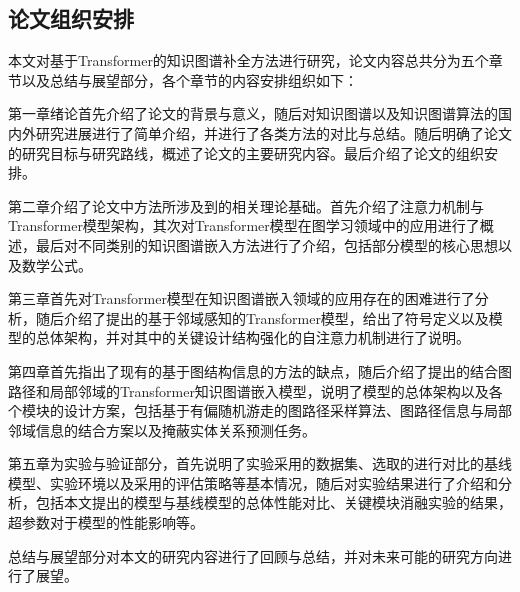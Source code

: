 \subsection{论文组织安排}
本文对基于Transformer的知识图谱补全方法进行研究，论文内容总共分为五个章节以及总结与展望部分，各个章节的内容安排组织如下：

第一章绪论首先介绍了论文的背景与意义，随后对知识图谱以及知识图谱算法的国内外研究进展进行了简单介绍，并进行了各类方法的对比与总结。随后明确了论文的研究目标与研究路线，概述了论文的主要研究内容。最后介绍了论文的组织安排。

第二章介绍了论文中方法所涉及到的相关理论基础。首先介绍了注意力机制与Transformer模型架构，其次对Transformer模型在图学习领域中的应用进行了概述，最后对不同类别的知识图谱嵌入方法进行了介绍，包括部分模型的核心思想以及数学公式。

第三章首先对Transformer模型在知识图谱嵌入领域的应用存在的困难进行了分析，随后介绍了提出的基于邻域感知的Transformer模型，给出了符号定义以及模型的总体架构，并对其中的关键设计结构强化的自注意力机制进行了说明。

第四章首先指出了现有的基于图结构信息的方法的缺点，随后介绍了提出的结合图路径和局部邻域的Transformer知识图谱嵌入模型，说明了模型的总体架构以及各个模块的设计方案，包括基于有偏随机游走的图路径采样算法、图路径信息与局部邻域信息的结合方案以及掩蔽实体关系预测任务。

第五章为实验与验证部分，首先说明了实验采用的数据集、选取的进行对比的基线模型、实验环境以及采用的评估策略等基本情况，随后对实验结果进行了介绍和分析，包括本文提出的模型与基线模型的总体性能对比、关键模块消融实验的结果，超参数对于模型的性能影响等。

总结与展望部分对本文的研究内容进行了回顾与总结，并对未来可能的研究方向进行了展望。
